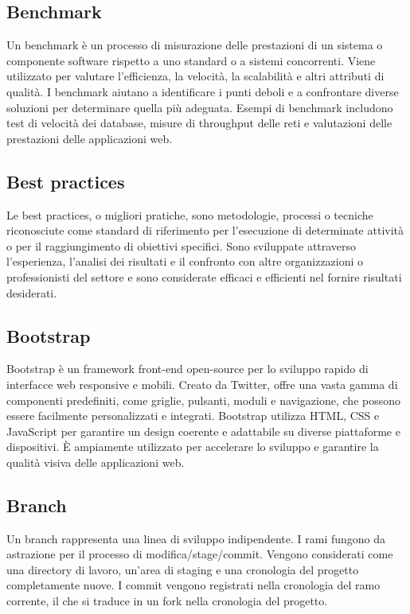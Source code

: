 \vspace{2em}
\subsection*{Benchmark}
Un benchmark è un processo di misurazione delle prestazioni di un sistema o componente software rispetto a uno standard o a sistemi concorrenti. Viene utilizzato per valutare l'efficienza, la velocità, la scalabilità e altri attributi di qualità. I benchmark aiutano a identificare i punti deboli e a confrontare diverse soluzioni per determinare quella più adeguata. Esempi di benchmark includono test di velocità dei database, misure di throughput delle reti e valutazioni delle prestazioni delle applicazioni web.

\vspace{2em}
\subsection*{Best practices}
Le best practices, o migliori pratiche, sono metodologie, processi o tecniche riconosciute come standard di riferimento per l'esecuzione di determinate attività o per il raggiungimento di obiettivi specifici. Sono sviluppate attraverso l'esperienza, l'analisi dei risultati e il confronto con altre organizzazioni o professionisti del settore e sono considerate efficaci e efficienti nel fornire risultati desiderati.

\vspace{2em}
\subsection*{Bootstrap}
Bootstrap è un framework front-end open-source per lo sviluppo rapido di interfacce web responsive e mobili. Creato da Twitter, offre una vasta gamma di componenti predefiniti, come griglie, pulsanti, moduli e navigazione, che possono essere facilmente personalizzati e integrati. Bootstrap utilizza HTML, CSS e JavaScript per garantire un design coerente e adattabile su diverse piattaforme e dispositivi. È ampiamente utilizzato per accelerare lo sviluppo e garantire la qualità visiva delle applicazioni web.

\vspace{2em}
\subsection*{Branch}
Un branch rappresenta una linea di sviluppo indipendente. I rami fungono da astrazione per il processo di modifica/stage/commit. Vengono considerati come una directory di lavoro, un'area di staging e una cronologia del progetto completamente nuove. I commit vengono registrati nella cronologia del ramo corrente, il che si traduce in un fork nella cronologia del progetto.

